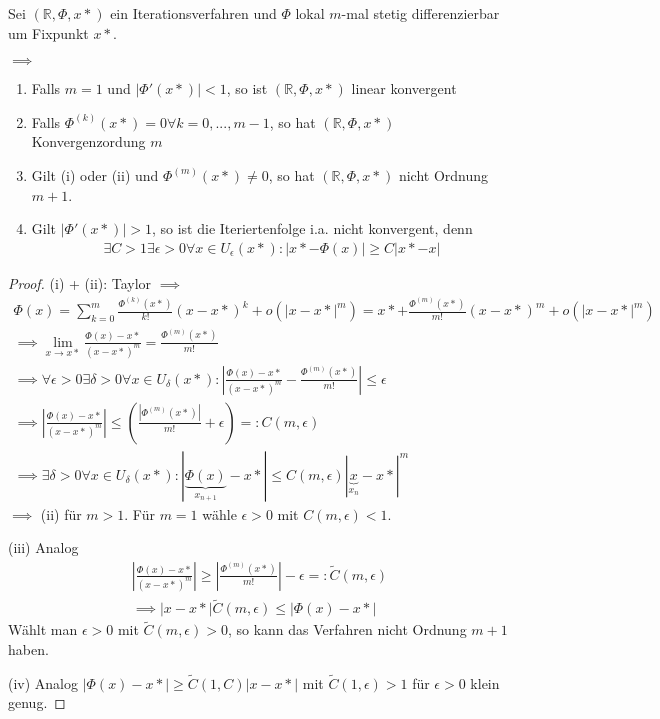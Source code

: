 	\begin{theorem}
	Sei $(\mathbb{R}, \Phi, x*)$ ein Iterationsverfahren und $\Phi$ lokal $m$-mal stetig differenzierbar um Fixpunkt $x*$.
	
	$\implies$
	\begin{enumerate}
		\item Falls $m=1$ und $|\Phi'(x*)| < 1$, so ist $(\mathbb{R}, \Phi, x*)$ linear konvergent
		\item Falls $\Phi^{(k)}(x*)=0 \forall k=0, ..., m-1$, so hat $(\mathbb{R}, \Phi, x*)$ Konvergenzordung $m$
		\item Gilt (i) oder (ii) und $\Phi^{(m)}(x*) \neq 0$, so hat $(\mathbb{R}, \Phi, x*)$ nicht Ordnung $m+1$.
		\item Gilt $|\Phi'(x*)| > 1$, so ist die Iteriertenfolge i.a. nicht konvergent, denn
		\begin{align*}
			\exists C>1 \exists \epsilon>0 \forall x \in U_\epsilon(x*): |x* - \Phi(x)| \geq C |x*-x|
		\end{align*}
	\end{enumerate}
\end{theorem}

\begin{proof}
	(i) + (ii): Taylor $\implies$
	\begin{align*}
		\Phi(x) = \sum_{k=0}^{m} \frac{\Phi^{(k)}(x*)}{k!}(x-x*)^k + o(|x-x*|^m) =
		x* + \frac{\Phi^{(m)}(x*)}{m!}(x-x*)^m + o(|x-x*|^m)\\
		\implies \lim\limits_{x\rightarrow x*} \frac{\Phi(x) - x*}{(x-x*)^m} = \frac{\Phi^{(m)}(x*)}{m!}\\
		\implies \forall \epsilon > 0 \exists \delta > 0 \forall x \in U_\delta(x*): \left|\frac{\Phi(x) - x*}{(x-x*)^m} - \frac{\Phi^{(m)}(x*)}{m!}\right| \leq \epsilon\\
		\implies \left|\frac{\Phi(x) - x*}{(x-x*)^m}\right| \leq \left(\frac{|\Phi^{(m)}(x*)|}{m!} + \epsilon\right) =: C(m, \epsilon)\\
		\implies \exists \delta > 0 \forall x \in U_\delta(x*) : |\underbrace{\Phi(x)}_{x_{n+1}} - x*| \leq C(m, \epsilon) |\underbrace{x}_{x_n} - x*|^m
	\end{align*}
	$\implies$ (ii) für $m > 1$. Für $m=1$ wähle $\epsilon > 0$ mit $C(m, \epsilon) < 1$.
	
	(iii) Analog
	\begin{align*}
		\left|\frac{\Phi(x) - x*}{(x-x*)^m}\right| \geq \left|\frac{\Phi^{(m)}(x*)}{m!}\right| - \epsilon =: \tilde{C}(m, \epsilon)\\
		\implies |x-x*| \tilde{C}(m, \epsilon) \leq |\Phi(x) - x*|
	\end{align*}
	Wählt man $\epsilon > 0$ mit $\tilde{C}(m, \epsilon) > 0$, so kann das Verfahren nicht Ordnung $m+1$ haben.
	
	(iv) Analog $|\Phi(x) - x*| \geq \tilde{C}(1, C) |x-x*|$ mit $\tilde{C}(1, \epsilon) > 1$ für $\epsilon > 0$ klein genug.
\end{proof}

